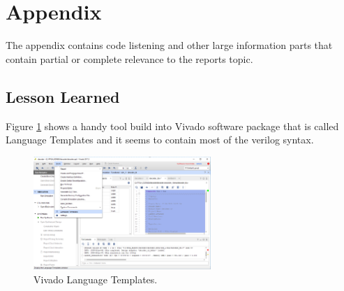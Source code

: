 \section{Appendix} \label{sec: Appendix}
The appendix contains code listening and other large information parts that contain partial or complete relevance to the reports topic. 

\subsection{Lesson Learned} \label{subsec: Lesson Learned}
Figure \ref{fig: Vivado_LanguageTemplates} shows a handy tool build into Vivado software package that is called Language Templates and it seems to contain most of the verilog syntax.
\begin{figure}[htbp]
	\centering
	\includegraphics[width=0.6\textwidth]{01_images/Vivado_LanguageTemplates.png}
	\caption{Vivado Language Templates.}
	\label{fig: Vivado_LanguageTemplates}
\end{figure}

